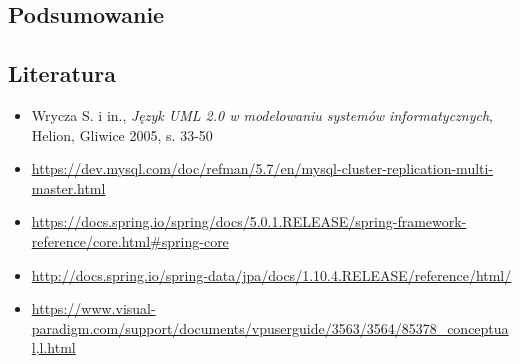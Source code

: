 \documentclass[]{article}
\begin{document}
\hypertarget{header-n180}{%
\subsection{Podsumowanie}\label{header-n180}}

\hypertarget{header-n181}{%
\subsection{Literatura}\label{header-n181}}

\begin{itemize}
\item
  Wrycza S. i in., \emph{Język UML 2.0 w modelowaniu systemów
  informatycznych}, Helion, Gliwice 2005, s. 33-50
\item
  \url{https://dev.mysql.com/doc/refman/5.7/en/mysql-cluster-replication-multi-master.html}
\item
  \url{https://docs.spring.io/spring/docs/5.0.1.RELEASE/spring-framework-reference/core.html\#spring-core}
\item
  \url{http://docs.spring.io/spring-data/jpa/docs/1.10.4.RELEASE/reference/html/}
\item
  \url{https://www.visual-paradigm.com/support/documents/vpuserguide/3563/3564/85378_conceptual,l.html}
\end{itemize}
\end{document}
